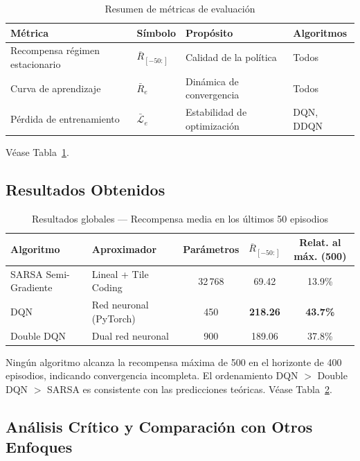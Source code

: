 \begin{table}[htb!]
\caption{Resumen de métricas de evaluación}\label{tab:metricas}
\centering\small
\begin{tabular}{@{}llll@{}}
\toprule
\textbf{Métrica} & \textbf{Símbolo} & \textbf{Propósito} & \textbf{Algoritmos} \\
\midrule
Recompensa régimen estacionario & $\overline{R}_{[-50:]}$ & Calidad de la política & Todos \\
Curva de aprendizaje & $\bar{R}_e$ & Dinámica de convergencia & Todos \\
Pérdida de entrenamiento & $\bar{\mathcal{L}}_e$ & Estabilidad de optimización & DQN, DDQN \\
\bottomrule
\end{tabular}
\end{table}

Véase Tabla~\ref{tab:metricas}.

\subsection{Resultados Obtenidos}

\begin{table}[htb!]
\caption{Resultados globales — Recompensa media en los últimos 50 episodios}\label{tab:resultados}
\centering\small
\begin{tabular}{@{}llccc@{}}
\toprule
\textbf{Algoritmo} & \textbf{Aproximador} & \textbf{Parámetros} & $\overline{R}_{[-50:]}$ & \textbf{Relat. al máx. (500)} \\
\midrule
SARSA Semi-Gradiente & Lineal + Tile Coding & 32\,768 & 69.42 & 13.9\% \\
DQN & Red neuronal (PyTorch) & 450 & \textbf{218.26} & \textbf{43.7\%} \\
Double DQN & Dual red neuronal & 900 & 189.06 & 37.8\% \\
\bottomrule
\end{tabular}
\end{table}

Ningún algoritmo alcanza la recompensa máxima de 500 en el horizonte de 400 episodios, indicando convergencia incompleta. El ordenamiento DQN $>$ Double DQN $>$ SARSA es consistente con las predicciones teóricas. Véase Tabla~\ref{tab:resultados}.

\subsection{Análisis Crítico y Comparación con Otros Enfoques}


